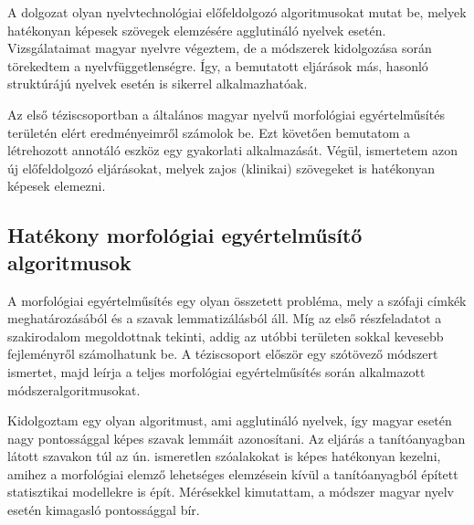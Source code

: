 \let\oldthesubsection=\thesubsection
\renewcommand{\thesubsection}{\Roman{subsection}}

A dolgozat olyan nyelvtechnológiai előfeldolgozó algoritmusokat mutat be, melyek hatékonyan képesek szövegek elemzésére agglutináló nyelvek esetén. 
Vizsgálataimat magyar nyelvre végeztem, de a módszerek kidolgozása során törekedtem a nyelvfüggetlenségre. 
Így, a bemutatott eljárások más, hasonló struktúrájú nyelvek esetén is sikerrel alkalmazhatóak.

Az első téziscsoportban a általános magyar nyelvű morfológiai egyértelműsítés területén elért eredményeimről számolok be. 
Ezt követően bemutatom a létrehozott annotáló eszköz egy gyakorlati alkalmazását. 
Végül, ismertetem azon új előfeldolgozó eljárásokat, melyek zajos (klinikai) szövegeket is hatékonyan képesek elemezni.

\subsection{Hatékony morfológiai egyértelműsítő algoritmusok}\label{thes:morf}

A morfológiai egyértelműsítés egy olyan összetett probléma, mely a szófaji címkék meghatározásából és a szavak lemmatizálásból áll. 
Míg az első részfeladatot a szakirodalom megoldottnak tekinti, addig az utóbbi területen sokkal kevesebb fejleményről számolhatunk be. 
A téziscsoport először egy szótövező módszert ismertet, majd leírja a teljes morfológiai egyértelműsítés során alkalmazott módszeralgoritmusokat.

\begin{core}
\begin{thesis}\label{thes:morf-lemma}
Kidolgoztam egy olyan algoritmust, ami agglutináló nyelvek, így magyar esetén nagy pontossággal képes szavak lemmáit azonosítani. 
Az eljárás a tanítóanyagban látott szavakon túl az ún. ismeretlen szóalakokat is képes hatékonyan kezelni, amihez a morfológiai elemző lehetséges elemzésein kívül a tanítóanyagból épített statisztikai modellekre is épít. 
Mérésekkel kimutattam, a módszer magyar nyelv esetén kimagasló pontossággal bír. 
\end{thesis} 

\begin{pub}
\cite{Orosz2011,Orosz2012,Orosz2012a,Orosz2013a}
\end{pub}
\end{core}

